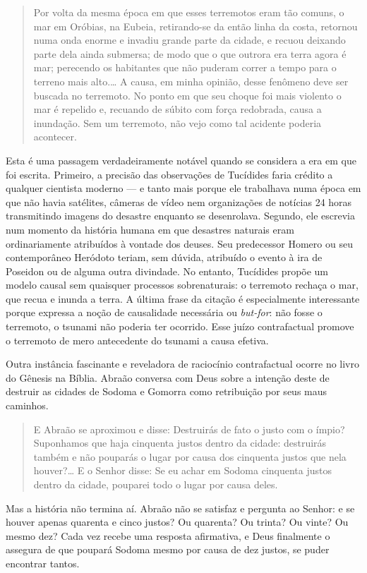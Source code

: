 \documentclass[11pt,a5paper,twoside]{book}
\begin{document}
\begin{quote}
Por volta da mesma época em que esses terremotos eram tão comuns, o mar em Oróbias, na Eubeia, retirando-se da então linha da costa, retornou numa onda enorme e invadiu grande parte da cidade, e recuou deixando parte dela ainda submersa; de modo que o que outrora era terra agora é mar; perecendo os habitantes que não puderam correr a tempo para o terreno mais alto.… A causa, em minha opinião, desse fenômeno deve ser buscada no terremoto. No ponto em que seu choque foi mais violento o mar é repelido e, recuando de súbito com força redobrada, causa a inundação. Sem um terremoto, não vejo como tal acidente poderia acontecer.
\end{quote}
Esta é uma passagem verdadeiramente notável quando se considera a era em que foi escrita. Primeiro, a precisão das observações de Tucídides faria crédito a qualquer cientista moderno — e tanto mais porque ele trabalhava numa época em que não havia satélites, câmeras de vídeo nem organizações de notícias 24 horas transmitindo imagens do desastre enquanto se desenrolava. Segundo, ele escrevia num momento da história humana em que desastres naturais eram ordinariamente atribuídos à vontade dos deuses. Seu predecessor Homero ou seu contemporâneo Heródoto teriam, sem dúvida, atribuído o evento à ira de Poseidon ou de alguma outra divindade. No entanto, Tucídides propõe um modelo causal sem quaisquer processos sobrenaturais: o terremoto rechaça o mar, que recua e inunda a terra. A última frase da citação é especialmente interessante porque expressa a noção de causalidade necessária ou \textit{but-for}: não fosse o terremoto, o tsunami não poderia ter ocorrido. Esse juízo contrafactual promove o terremoto de mero antecedente do tsunami a causa efetiva.

Outra instância fascinante e reveladora de raciocínio contrafactual ocorre no livro do Gênesis na Bíblia. Abraão conversa com Deus sobre a intenção deste de destruir as cidades de Sodoma e Gomorra como retribuição por seus maus caminhos.

\begin{quote}
E Abraão se aproximou e disse: Destruirás de fato o justo com o ímpio? Suponhamos que haja cinquenta justos dentro da cidade: destruirás também e não pouparás o lugar por causa dos cinquenta justos que nela houver?… E o Senhor disse: Se eu achar em Sodoma cinquenta justos dentro da cidade, pouparei todo o lugar por causa deles.
\end{quote}
Mas a história não termina aí. Abraão não se satisfaz e pergunta ao Senhor: e se houver apenas quarenta e cinco justos? Ou quarenta? Ou trinta? Ou vinte? Ou mesmo dez? Cada vez recebe uma resposta afirmativa, e Deus finalmente o assegura de que poupará Sodoma mesmo por causa de dez justos, se puder encontrar tantos.
\end{document}
